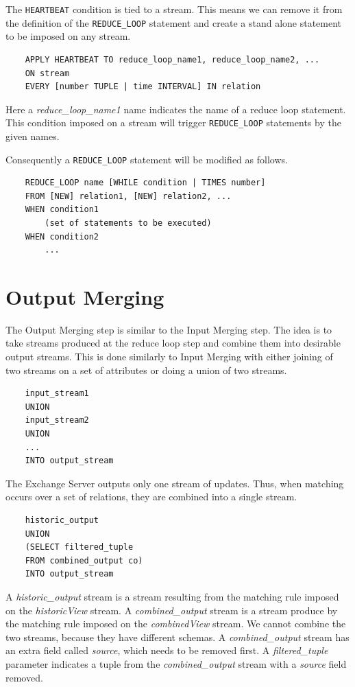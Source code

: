 \documentclass{article}
\begin{document}
The {\tt HEARTBEAT} condition is tied to a stream. This means we can remove it from the definition of the {\tt REDUCE\_LOOP} statement and create a stand alone statement to be imposed on any stream. 

\begin{verbatim}
    APPLY HEARTBEAT TO reduce_loop_name1, reduce_loop_name2, ...
    ON stream
    EVERY [number TUPLE | time INTERVAL] IN relation
\end{verbatim}

\noindent Here a \emph{reduce\_loop\_name1} name indicates the name of a reduce loop statement. This condition imposed on a stream will trigger {\tt REDUCE\_LOOP} statements by the given names. 

Consequently a {\tt REDUCE\_LOOP} statement will be modified as follows.

\begin{verbatim}
    REDUCE_LOOP name [WHILE condition | TIMES number]
    FROM [NEW] relation1, [NEW] relation2, ... 
    WHEN condition1
        (set of statements to be executed)
    WHEN condition2
        ...
\end{verbatim}

\section{Output Merging}

The Output Merging step is similar to the Input Merging step. The idea is to take streams produced at the reduce loop step and combine them into desirable output streams. This is done similarly to Input Merging with either joining of two streams on a set of attributes or doing a union of two streams.

\begin{verbatim}   
    input_stream1
    UNION
    input_stream2
    UNION
    ...
    INTO output_stream
\end{verbatim}

The Exchange Server outputs only one stream of updates. Thus, when matching occurs over a set of relations, they are combined into a single stream.

\begin{verbatim}
    historic_output
    UNION
    (SELECT filtered_tuple
    FROM combined_output co)
    INTO output_stream
\end{verbatim}

\noindent A \emph{historic\_output} stream is a stream resulting from the matching rule imposed on the \emph{historicView} stream. A \emph{combined\_output} stream is a stream produce by the matching rule imposed on the \emph{combinedView} stream. We cannot combine the two streams, because they have different schemas. A \emph{combined\_output} stream has an extra field called \emph{source}, which needs to be removed first. A \emph{filtered\_tuple} parameter indicates a tuple from the \emph{combined\_output} stream with a \emph{source} field removed.
\end{document}
